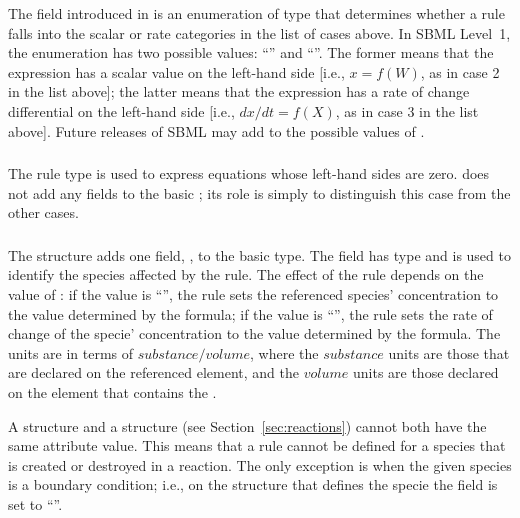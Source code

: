 \documentclass[10pt]{cekarticle}
\newcommand{\changed}[1]{\textcolor{BrickRed}{#1}}
\newenvironment{blockChanged}{\color{BrickRed}}{}
\begin{document}
\begin{blockChanged}
The  field introduced in  is an
enumeration of type  that determines whether a rule falls
into the scalar or rate categories in the list of cases above.  In SBML
Level~1, the enumeration has two possible values: ``'' and
``''.  The former means that the expression has a scalar value
on the left-hand side [i.e., $x = f(W)$, as in case 2 in the list above];
the latter means that the expression has a rate of change differential on
the left-hand side [i.e., $dx/dt = f(X)$, as in case 3 in the list above].
Future releases of SBML may add to the possible values of .
\end{blockChanged}


\subsubsection{}

The rule type  is used to express equations whose
left-hand sides are zero.   does not add any fields to
the basic ; its role is simply to distinguish this case from
the other cases.


\subsubsection{}

The  structure adds one field,
\changed{}, to the basic  type.  The
field \changed{} has type  and is used to
identify the \changed{species} affected by the rule.  The effect of the
rule depends on the value of : if the value is
``'', the rule sets the referenced \changed{species}'
concentration to the value determined by the formula; if the value is
``'', the rule sets the rate of change of the \changed{specie}'
concentration to the value determined by the formula.  The units are in
terms of $substance/volume$, where the $substance$ units are those that are
declared on the referenced  element, and the $volume$ units
are those declared on the  element that contains the
.

\begin{blockChanged}
A  structure and a
 structure (see
Section~\ref{sec:reactions}) cannot both have the same 
attribute value.  This means that a rule cannot be defined for a
species that is created or destroyed in a reaction.  The only
exception is when the given species is a boundary condition; i.e.,
on the  structure that defines the specie the
 field is set to ``''.
\end{blockChanged}
\end{document}
